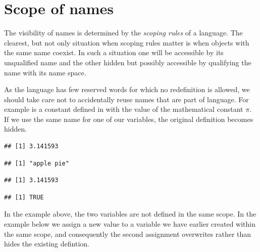 \documentclass[krantz2]{krantz}\usepackage{knitr}%
\begin{document}
\section{Scope of names}

The visibility of names is determined by the \emph{scoping rules} of a language. The clearest, but not only situation when scoping rules matter is when objects with the same name coexist. In such a situation one will be accessible by its unqualified name and the other hidden but possibly accessible by qualifying the name with its name space.

As the \Rlang language has few reserved words for which no redefinition is allowed, we should take care not to accidentally reuse names that are part of language. For example  is a constant defined in \Rlang with the value of the mathematical constant $\pi$. If we use the same name for one of our variables, the original definition becomes hidden.

\begin{knitrout}\footnotesize
{}\color{fgcolor}\begin{kframe}
\begin{alltt}
\end{alltt}
\begin{verbatim}
## [1] 3.141593
\end{verbatim}
\begin{alltt}
 \hlkwb{<-} 
\end{alltt}
\begin{verbatim}
## [1] "apple pie"
\end{verbatim}
\begin{alltt}
\end{alltt}
\begin{verbatim}
## [1] 3.141593
\end{verbatim}
\begin{alltt}
\hlstd{(}\hlstd{)}
\end{alltt}
\begin{verbatim}
## [1] TRUE
\end{verbatim}
\end{kframe}
\end{knitrout}

In the example above, the two variables are not defined in the same scope. In the example below we assign a new value to a variable we have earlier created within the same scope, and consequently the second assignment overwrites rather than hides the existing defintion.
\end{document}
